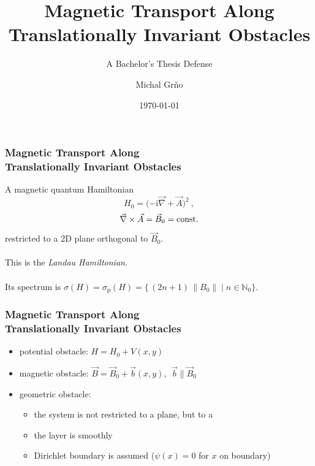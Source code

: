 \documentclass{beamer}
\title[Magnetic Transport]{Magnetic Transport Along \\ Translationally Invariant Obstacles}
\subtitle{A Bachelor's Thesis Defense}
\author{Michal Grňo}
\date{\today}
\renewcommand{\i}{\ensuremath{\mathrm i}}
\newcommand{\N}{\ensuremath{\mathbb N}}
\begin{document}
\begin{frame}
    \titlepage
\end{frame}

\begin{frame}
    \frametitle{Magnetic \color{gray} Transport Along \\ Translationally Invariant Obstacles}
    \pause
    A magnetic quantum Hamiltonian
    \begin{equation*}
        H_0 = \big({ -\i\vec\nabla + \vec A }\big)^2 \: ,
    \end{equation*}
    \pause\vspace{-\baselineskip}
    \begin{equation*}
        \vec\nabla \times \vec A = \vec B_0 = \text{const.}
        \vspace{5pt}
    \end{equation*}
    \pause
    restricted to a 2D plane orthogonal to $\vec B_0$.
    \\\phantom{.}\\
    \pause
    This is the \textit{Landau Hamiltonian}.
    \\\phantom{.}\\
    \pause
    Its spectrum is $\sigma(H) = \sigma_{\mathrm p}(H) = \Big\{ \, (2n+1) \, \lVert B_0\rVert \;\Big|\; n \in \N_0 \Big\}$.
\end{frame}

\begin{frame}
    \frametitle{{\color{gray}Magnetic Transport Along \\ Translationally Invariant} Obstacles}
    \begin{itemize}
        \pause
        \item potential obstacle: $H = H_0 + V(x,y)$
        \pause
        \item magnetic obstacle: $\vec B = \vec B_0 + \vec b(x,y)$\pause, $\; \vec b \parallel \vec B_0$
        \pause
        \item geometric obstacle:
        \begin{itemize}
            \item the system is not restricted to a plane, but to a 
            \pause
            \item the layer is smoothly 
            \pause
            \item Dirichlet boundary is assumed ($\psi(x) = 0$ for $x$ on boundary)
        \end{itemize}
    \end{itemize}
\end{frame}
\end{document}
